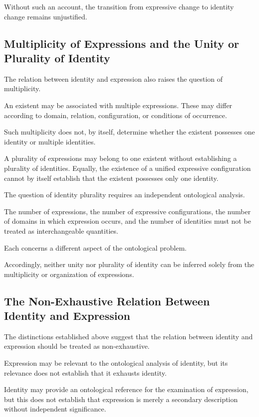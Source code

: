 Without such an account, the transition from
expressive change to identity change remains
unjustified.

\subsection{Multiplicity of Expressions and the Unity or Plurality of Identity}

The relation between identity and expression also
raises the question of multiplicity.

An existent may be associated with multiple expressions.
These may differ according to domain, relation,
configuration, or conditions of occurrence.

Such multiplicity does not, by itself, determine
whether the existent possesses one identity or
multiple identities.

A plurality of expressions may belong to one existent
without establishing a plurality of identities.
Equally, the existence of a unified expressive
configuration cannot by itself establish that
the existent possesses only one identity.

The question of identity plurality requires an
independent ontological analysis.

The number of expressions, the number of expressive
configurations, the number of domains in which
expression occurs, and the number of identities
must not be treated as interchangeable quantities.

Each concerns a different aspect of the ontological
problem.

Accordingly, neither unity nor plurality of identity
can be inferred solely from the multiplicity or
organization of expressions.

\subsection{The Non-Exhaustive Relation Between Identity and Expression}

The distinctions established above suggest that
the relation between identity and expression should
be treated as non-exhaustive.

Expression may be relevant to the ontological analysis
of identity, but its relevance does not establish
that it exhausts identity.

Identity may provide an ontological reference for
the examination of expression, but this does not
establish that expression is merely a secondary
description without independent significance.

